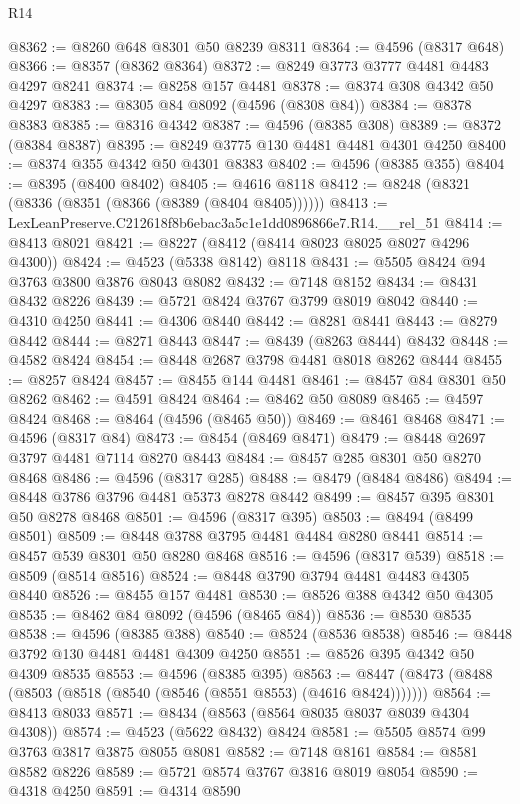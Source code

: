 \begin{lexlean}{R14}
\begin{coremodule}
@8362 := @8260 @648 @8301 @50 @8239 @8311
@8364 := @4596 (@8317 @648)
@8366 := @8357 (@8362 @8364)
@8372 := @8249 @3773 @3777 @4481 @4483 @4297 @8241
@8374 := @8258 @157 @4481
@8378 := @8374 @308 @4342 @50 @4297
@8383 := @8305 @84 @8092 (@4596 (@8308 @84))
@8384 := @8378 @8383
@8385 := @8316 @4342
@8387 := @4596 (@8385 @308)
@8389 := @8372 (@8384 @8387)
@8395 := @8249 @3775 @130 @4481 @4481 @4301 @4250
@8400 := @8374 @355 @4342 @50 @4301 @8383
@8402 := @4596 (@8385 @355)
@8404 := @8395 (@8400 @8402)
@8405 := @4616 @8118
@8412 := @8248 (@8321 (@8336 (@8351 (@8366 (@8389 (@8404 @8405))))))
@8413 := LexLeanPreserve.C212618f8b6ebac3a5c1e1dd0896866e7.R14.__rel_51
@8414 := @8413 @8021
@8421 := @8227 (@8412 (@8414 @8023 @8025 @8027 @4296 @4300))
@8424 := @4523 (@5338 @8142) @8118
@8431 := @5505 @8424 @94 @3763 @3800 @3876 @8043 @8082
@8432 := @7148 @8152
@8434 := @8431 @8432 @8226
@8439 := @5721 @8424 @3767 @3799 @8019 @8042
@8440 := @4310 @4250
@8441 := @4306 @8440
@8442 := @8281 @8441
@8443 := @8279 @8442
@8444 := @8271 @8443
@8447 := @8439 (@8263 @8444) @8432
@8448 := @4582 @8424
@8454 := @8448 @2687 @3798 @4481 @8018 @8262 @8444
@8455 := @8257 @8424
@8457 := @8455 @144 @4481
@8461 := @8457 @84 @8301 @50 @8262
@8462 := @4591 @8424
@8464 := @8462 @50 @8089
@8465 := @4597 @8424
@8468 := @8464 (@4596 (@8465 @50))
@8469 := @8461 @8468
@8471 := @4596 (@8317 @84)
@8473 := @8454 (@8469 @8471)
@8479 := @8448 @2697 @3797 @4481 @7114 @8270 @8443
@8484 := @8457 @285 @8301 @50 @8270 @8468
@8486 := @4596 (@8317 @285)
@8488 := @8479 (@8484 @8486)
@8494 := @8448 @3786 @3796 @4481 @5373 @8278 @8442
@8499 := @8457 @395 @8301 @50 @8278 @8468
@8501 := @4596 (@8317 @395)
@8503 := @8494 (@8499 @8501)
@8509 := @8448 @3788 @3795 @4481 @4484 @8280 @8441
@8514 := @8457 @539 @8301 @50 @8280 @8468
@8516 := @4596 (@8317 @539)
@8518 := @8509 (@8514 @8516)
@8524 := @8448 @3790 @3794 @4481 @4483 @4305 @8440
@8526 := @8455 @157 @4481
@8530 := @8526 @388 @4342 @50 @4305
@8535 := @8462 @84 @8092 (@4596 (@8465 @84))
@8536 := @8530 @8535
@8538 := @4596 (@8385 @388)
@8540 := @8524 (@8536 @8538)
@8546 := @8448 @3792 @130 @4481 @4481 @4309 @4250
@8551 := @8526 @395 @4342 @50 @4309 @8535
@8553 := @4596 (@8385 @395)
@8563 := @8447 (@8473 (@8488 (@8503 (@8518 (@8540 (@8546 (@8551 @8553) (@4616 @8424)))))))
@8564 := @8413 @8033
@8571 := @8434 (@8563 (@8564 @8035 @8037 @8039 @4304 @4308))
@8574 := @4523 (@5622 @8432) @8424
@8581 := @5505 @8574 @99 @3763 @3817 @3875 @8055 @8081
@8582 := @7148 @8161
@8584 := @8581 @8582 @8226
@8589 := @5721 @8574 @3767 @3816 @8019 @8054
@8590 := @4318 @4250
@8591 := @4314 @8590

\end{coremodule}
\end{lexlean}
